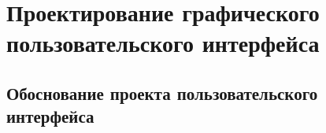 
\section{Проектирование графического пользовательского интерфейса} %
\label{sec:gui_design}


\subsection{Обоснование проекта пользовательского интерфейса}
\label{sub:gui_design:motivation}

